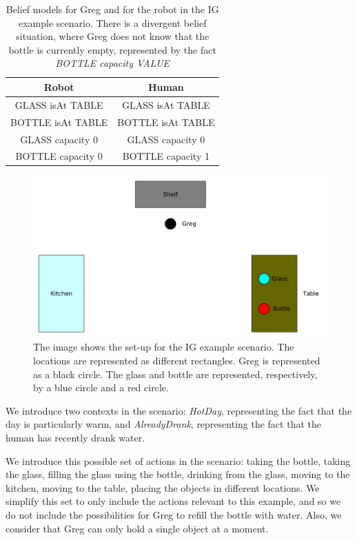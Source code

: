  \begin{table}[h!]
\centering
\scriptsize
\renewcommand{\arraystretch}{1.3}
\begin{tabular}{|c|c|}
\hline
Robot & Human \\ \hline \hline
GLASS isAt TABLE  & GLASS isAt TABLE \\ \hline
BOTTLE isAt TABLE & BOTTLE isAt TABLE \\ \hline
GLASS capacity 0  & GLASS capacity 0  \\ \hline
BOTTLE capacity 0 & BOTTLE capacity 1 \\ 
\hline
\end{tabular}
\caption[Belief models in the IG scenario]{Belief models for Greg and for the robot in the IG example scenario. There is a divergent belief situation, where Greg does not know that the bottle is currently empty, represented by the fact \textit{BOTTLE capacity VALUE} }
 \label{table:intention-ig_bm}    
\end{table}



 \begin{figure}[ht!]
	\includegraphics[scale=0.5]{img/observer/ig_scenario.pdf}
	\caption[IG Example Scenario]{The image shows the set-up for the IG example scenario. The locations are represented as different rectangles. Greg is represented as a black circle. The glass and bottle are represented, respectively, by a blue circle and a red circle.}
	\label{fig:intention-ig_scenario}
\end{figure}

We introduce two contexts in the scenario: \textit{HotDay}, representing the fact that the day is particularly warm, and \textit{AlreadyDrank}, representing the fact that the human has recently drank water.

We introduce this possible set of actions in the scenario: taking the bottle, taking the glass, filling the glass using the bottle, drinking from the glass, moving to the kitchen, moving to the table, placing the objects in different locations. We simplify this set to only include the actions relevant to this example, and so we do not include the possibilities for Greg to refill the bottle with water. Also, we consider that Greg can only hold a single object at a moment. 

